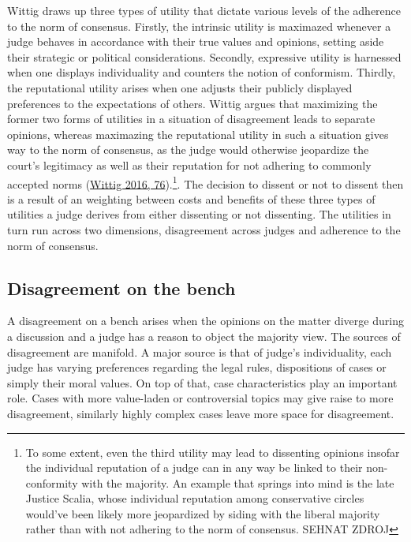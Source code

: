 \documentclass[
  11pt,
]{article}
\begin{document}
Wittig draws up three types of utility that dictate various levels of
the adherence to the norm of consensus. Firstly, the intrinsic utility
is maximazed whenever a judge behaves in accordance with their true
values and opinions, setting aside their strategic or political
considerations. Secondly, expressive utility is harnessed when one
displays individuality and counters the notion of conformism. Thirdly,
the reputational utility arises when one adjusts their publicly
displayed preferences to the expectations of others. Wittig argues that
maximizing the former two forms of utilities in a situation of
disagreement leads to separate opinions, whereas maximazing the
reputational utility in such a situation gives way to the norm of
consensus, as the judge would otherwise jeopardize the court's
legitimacy as well as their reputation for not adhering to commonly
accepted norms
(\protect\hyperlink{ref-wittigOccurrenceSeparateOpinions2016}{Wittig
2016, 76}).\footnote{To some extent, even the third utility may lead to
  dissenting opinions insofar the individual reputation of a judge can
  in any way be linked to their non-conformity with the majority. An
  example that springs into mind is the late Justice Scalia, whose
  individual reputation among conservative circles would've been likely
  more jeopardized by siding with the liberal majority rather than with
  not adhering to the norm of consensus. SEHNAT ZDROJ}. The decision to
dissent or not to dissent then is a result of an weighting between costs
and benefits of these three types of utilities a judge derives from
either dissenting or not dissenting. The utilities in turn run across
two dimensions, disagreement across judges and adherence to the norm of
consensus.

\hypertarget{disagreement-on-the-bench}{%
\subsection{Disagreement on the bench}\label{disagreement-on-the-bench}}

A disagreement on a bench arises when the opinions on the matter diverge
during a discussion and a judge has a reason to object the majority
view. The sources of disagreement are manifold. A major source is that
of judge's individuality, each judge has varying preferences regarding
the legal rules, dispositions of cases or simply their moral values. On
top of that, case characteristics play an important role. Cases with
more value-laden or controversial topics may give raise to more
disagreement, similarly highly complex cases leave more space for
disagreement.
\end{document}
